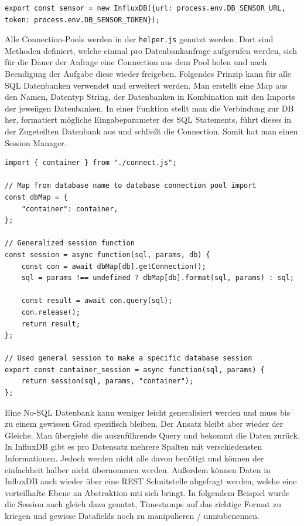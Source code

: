 \documentclass[
    headings=optiontotocandhead,%
    twoside,
    numbers=noenddot,%
    12pt, %
    titlepage, %
    parskip=full, %
    listof=leveldown, 
    numbers=noenddot, %
    a4paper,DIV=14,
    BCOR=15mm,
]{scrbook}
\newcommand{\passthrough}[1]{#1}
\begin{document}
\begin{lstlisting}[caption={InfluxDB Connection Pool für die Sensor DB}]
export const sensor = new InfluxDB({url: process.env.DB_SENSOR_URL, token: process.env.DB_SENSOR_TOKEN});
\end{lstlisting}

Alle Connection-Pools werden in der \passthrough{\lstinline!helper.js!}
genutzt werden. Dort sind Methoden definiert, welche einmal pro
Datenbankanfrage aufgerufen werden, sich für die Dauer der Anfrage eine
Connection aus dem Pool holen und nach Beendigung der Aufgabe diese
wieder freigeben. Folgendes Prinzip kann für alle SQL Datenbanken
verwendet und erweitert werden. Man erstellt eine Map aus den Namen,
Datentyp String, der Datenbanken in Kombination mit den Imports der
jeweiigen Datenbanken. In einer Funktion stellt man die Verbindung zur
DB her, formatiert mögliche Eingabeparameter des SQL Statements, führt
dieses in der Zugeteilten Datenbank aus und schließt die Connection.
Somit hat man einen Session Manager.

\begin{lstlisting}[caption={SQL Session Manager}]
import { container } from "./connect.js";

// Map from database name to database connection pool import
const dbMap = {
    "container": container,
};

// Generalized session function
const session = async function(sql, params, db) {    
    const con = await dbMap[db].getConnection();
    sql = params !== undefined ? dbMap[db].format(sql, params) : sql;
    
    const result = await con.query(sql);
    con.release();
    return result;
};

// Used general session to make a specific database session
export const container_session = async function(sql, params) {
    return session(sql, params, "container");
};
\end{lstlisting}

Eine No-SQL Datenbank kann weniger leicht generalisiert werden und muss
bis zu einem gewissen Grad spezifisch bleiben. Der Ansatz bleibt aber
wieder der Gleiche. Man übergiebt die auszuführende Query und bekommt
die Daten zurück. In InfluxDB gibt es pro Datensatz mehrere Spalten mit
verschiedensten Informationen. Jedoch werden nicht alle davon benötigt
und können der einfachheit halber nicht übernommen werden. Außerdem
können Daten in InfluxDB auch wieder über eine REST Schnitstelle
abgefragt werden, welche eine vorteilhafte Ebene an Abstraktion mti sich
bringt. In folgendem Beispiel wurde die Session auch gleich dazu
genutzt, Timestamps auf das richtige Format zu kriegen und gewisse
Datafields noch zu manipulieren / umzubenennen.
\end{document}
